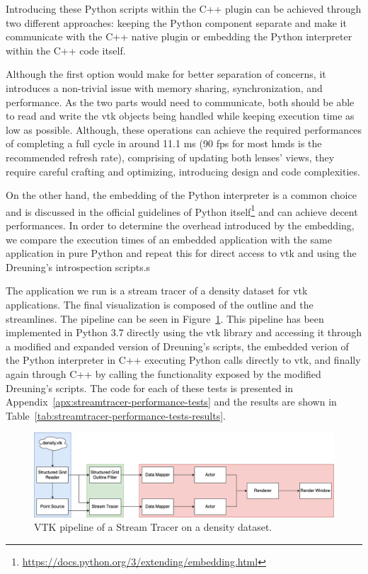 Introducing these Python scripts within the C++ plugin can be achieved through two different approaches: keeping the Python component separate and make it communicate with the C++ native plugin or embedding the Python interpreter within the C++ code itself. 

Although the first option would make for better separation of concerns, it introduces a non-trivial issue with memory sharing, synchronization, and performance. As the two parts would need to communicate, both should be able to read and write the \acrshort{vtk} objects being handled while keeping execution time as low as possible. Although, these operations can achieve the required performances of completing a full cycle in around 11.1 ms (90 \acrshort{fps} for most \acrshort{hmd}s is the recommended refresh rate), comprising of updating both lenses' views, they require careful crafting and optimizing, introducing design and code complexities.

On the other hand, the embedding of the Python interpreter is a common choice and is discussed in the official guidelines of Python itself\footnote{\url{https://docs.python.org/3/extending/embedding.html}} and can achieve decent performances. In order to determine the overhead introduced by the embedding, we compare the execution times of an embedded application with the same application in pure Python and repeat this for direct access to \acrshort{vtk} and using the Dreuning's introspection scripts.s

The application we run is a stream tracer of a density dataset for \acrshort{vtk} applications. The final visualization is composed of the outline and the streamlines. The pipeline can be seen in Figure~\ref{fig:streamtracer_pipeline}. This pipeline has been implemented in Python 3.7 directly using the \acrshort{vtk} library and accessing it through a modified and expanded version of Dreuning's scripts, the embedded verion of the Python interpreter in C++ executing Python calls directly to \acrshort{vtk}, and finally again through C++ by calling the functionality exposed by the modified Dreuning's scripts. The code for each of these tests is presented in Appendix~\ref{apx:streamtracer-performance-tests} and the results are shown in Table~\ref{tab:streamtracer-performance-tests-results}.

\begin{figure}[t]
    \centering
    \includegraphics[width=\textwidth]{pictures/streamtracer_pipeline.png}
    \caption{VTK pipeline of a Stream Tracer on a density dataset.}
    \label{fig:streamtracer_pipeline}
\end{figure}


